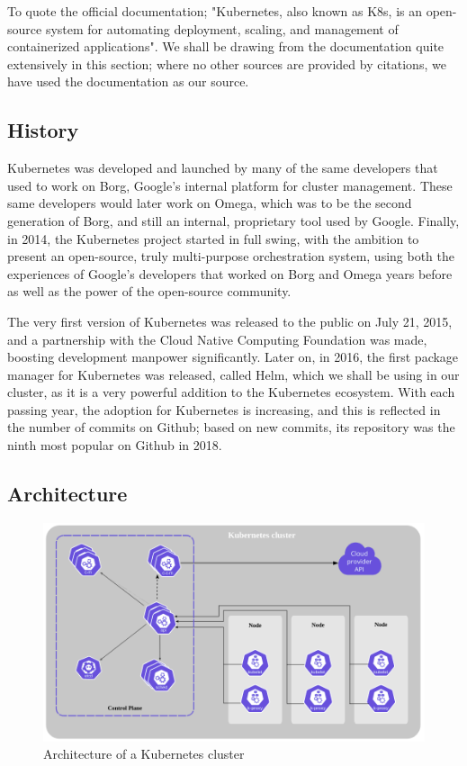 \documentclass[thesis=B,english]{FITthesis}[2019/12/23]
\begin{document}
To quote the official documentation; "Kubernetes, also known as K8s, is an open-source system for automating deployment, scaling, and management of containerized applications". \cite{kube-documentation} We shall be drawing from the documentation quite extensively in this section; where no other sources are provided by citations, we have used the documentation as our source.

\subsection{History}

Kubernetes was developed and launched by many of the same developers that used to work on Borg, Google's internal platform for cluster management. \cite{unix-handbook} These same developers would later work on Omega, which was to be the second generation of Borg, and still an internal, proprietary tool used by Google. Finally, in 2014, the Kubernetes project started in full swing, with the ambition to present an open-source, truly multi-purpose orchestration system, using both the experiences of Google's developers that worked on Borg and Omega years before as well as the power of the open-source community. \cite{medium-kube-history}

The very first version of Kubernetes was released to the public on July 21, 2015, and a partnership with the Cloud Native Computing Foundation was made, boosting development manpower significantly. Later on, in 2016, the first package manager for Kubernetes was released, called Helm, which we shall be using in our cluster, as it is a very powerful addition to the Kubernetes ecosystem. With each passing year, the adoption for Kubernetes is increasing, and this is reflected in the number of commits on Github; based on new commits, its repository was the ninth most popular on Github in 2018. \cite{cncf-kube-graduate}


\subsection{Architecture}

\begin{figure}[H]
\centering
\caption{Architecture of a Kubernetes cluster \cite{kube-components}}
\hspace*{-2cm}
\includegraphics[scale=0.5]{kube-architecture}
\end{figure}
\end{document}
